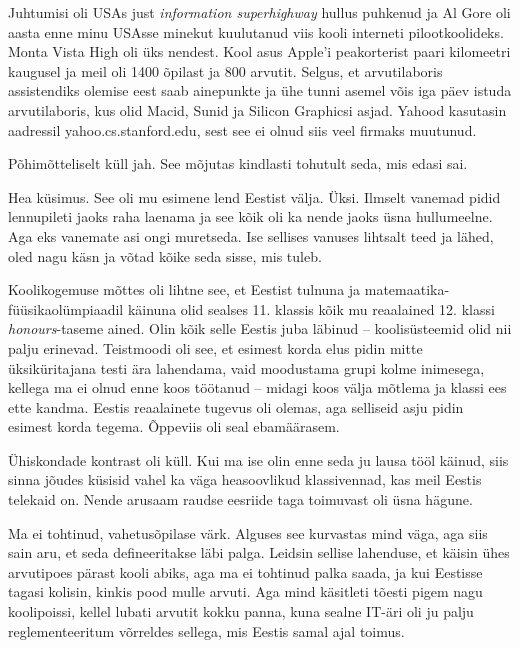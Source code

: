 Juhtumisi oli USAs just \emph{information 
superhighway} hullus puhkenud ja Al Gore oli aasta enne 
minu USAsse minekut kuulutanud viis kooli interneti 
pilootkoolideks. Monta Vista High oli üks nendest. Kool asus
Apple'i peakorterist paari kilomeetri kaugusel ja meil oli 1400 õpilast ja 800 arvutit. Selgus, et arvutilaboris 
assistendiks olemise eest saab ainepunkte ja ühe tunni asemel võis iga 
päev istuda arvutilaboris, kus olid Macid, Sunid ja Silicon Graphicsi 
asjad. Yahood kasutasin aadressil yahoo.cs.stanford.edu, sest see ei olnud siis veel 
firmaks muutunud.


Põhimõtteliselt küll jah. See mõjutas kindlasti tohutult seda, mis edasi 
sai. 


Hea küsimus. See oli mu esimene lend Eestist välja. Üksi. Ilmselt vanemad 
pidid lennupileti jaoks raha laenama ja see kõik oli ka 
nende jaoks üsna hullumeelne. Aga eks vanemate 
asi ongi muretseda. Ise sellises vanuses lihtsalt teed ja lähed, 
oled nagu käsn ja võtad kõike seda sisse, mis tuleb. 

Koolikogemuse mõttes oli lihtne
see, et Eestist tulnuna ja matemaatika-füüsikaolümpiaadil käinuna olid sealses
11. klassis kõik mu reaalained 12. klassi \emph{honours}-taseme ained. Olin kõik selle Eestis juba läbinud -- koolisüsteemid olid nii palju erinevad. 
Teistmoodi oli see, et esimest korda elus pidin 
mitte üksiküritajana testi ära lahendama, vaid moodustama grupi kolme inimesega, 
kellega ma ei olnud enne koos töötanud -- midagi koos välja mõtlema ja klassi ees 
ette kandma. Eestis reaalainete tugevus oli olemas, aga selliseid asju pidin esimest korda tegema. Õppeviis oli seal 
ebamäärasem. 

Ühiskondade kontrast oli küll. Kui ma ise olin enne seda ju lausa tööl käinud, 
siis sinna jõudes küsisid vahel ka väga heasoovlikud klassivennad, kas meil 
Eestis telekaid on. Nende arusaam raudse eesriide taga 
toimuvast oli üsna hägune. 


Ma ei tohtinud, vahetusõpilase värk. Alguses see kurvastas mind 
väga, aga siis sain aru, et seda defineeritakse läbi palga. Leidsin sellise lahenduse, et käisin 
ühes arvutipoes pärast kooli abiks, aga ma ei tohtinud palka saada, ja kui 
Eestisse tagasi kolisin, kinkis pood mulle arvuti. Aga mind käsitleti tõesti pigem nagu 
koolipoissi, kellel lubati arvutit kokku panna, kuna sealne IT-äri oli ju palju 
reglementeeritum võrreldes sellega, mis Eestis samal ajal toimus. 

